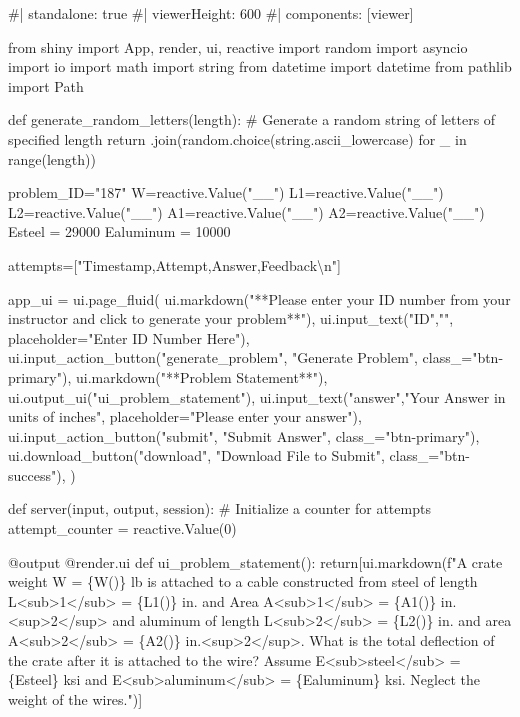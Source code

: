 \documentclass[
  letterpaper,
  DIV=11,
  numbers=noendperiod]{scrreprt}
\newenvironment{Shaded}{\begin{snugshade}}{\end{snugshade}}
\newcommand{\NormalTok}[1]{\textcolor[rgb]{0.00,0.23,0.31}{#1}}
\begin{document}
\begin{Shaded}
\begin{Highlighting}[]
\NormalTok{\#| standalone: true}
\NormalTok{\#| viewerHeight: 600}
\NormalTok{\#| components: [viewer]}

\NormalTok{from shiny import App, render, ui, reactive}
\NormalTok{import random}
\NormalTok{import asyncio}
\NormalTok{import io}
\NormalTok{import math}
\NormalTok{import string}
\NormalTok{from datetime import datetime}
\NormalTok{from pathlib import Path}

\NormalTok{def generate\_random\_letters(length):}
\NormalTok{    \# Generate a random string of letters of specified length}
\NormalTok{    return \textquotesingle{}\textquotesingle{}.join(random.choice(string.ascii\_lowercase) for \_ in range(length)) }

\NormalTok{problem\_ID="187"}
\NormalTok{W=reactive.Value("\_\_")}
\NormalTok{L1=reactive.Value("\_\_")}
\NormalTok{L2=reactive.Value("\_\_")}
\NormalTok{A1=reactive.Value("\_\_")}
\NormalTok{A2=reactive.Value("\_\_")}
\NormalTok{Esteel = 29000}
\NormalTok{Ealuminum = 10000}


\NormalTok{attempts=["Timestamp,Attempt,Answer,Feedback\textbackslash{}n"]}

\NormalTok{app\_ui = ui.page\_fluid(}
\NormalTok{    ui.markdown("**Please enter your ID number from your instructor and click to generate your problem**"),}
\NormalTok{    ui.input\_text("ID","", placeholder="Enter ID Number Here"),}
\NormalTok{    ui.input\_action\_button("generate\_problem", "Generate Problem", class\_="btn{-}primary"),}
\NormalTok{    ui.markdown("**Problem Statement**"),}
\NormalTok{    ui.output\_ui("ui\_problem\_statement"),}
\NormalTok{    ui.input\_text("answer","Your Answer in units of inches", placeholder="Please enter your answer"),}
\NormalTok{    ui.input\_action\_button("submit", "Submit Answer", class\_="btn{-}primary"),}
\NormalTok{    ui.download\_button("download", "Download File to Submit", class\_="btn{-}success"),}
\NormalTok{)}


\NormalTok{def server(input, output, session):}
\NormalTok{    \# Initialize a counter for attempts}
\NormalTok{    attempt\_counter = reactive.Value(0)}

\NormalTok{    @output}
\NormalTok{    @render.ui}
\NormalTok{    def ui\_problem\_statement():}
\NormalTok{        return[ui.markdown(f"A crate weight W = \{W()\} lb is attached to a cable constructed from steel of length L\textless{}sub\textgreater{}1\textless{}/sub\textgreater{} = \{L1()\} in. and Area A\textless{}sub\textgreater{}1\textless{}/sub\textgreater{} = \{A1()\} in.\textless{}sup\textgreater{}2\textless{}/sup\textgreater{} and aluminum of length L\textless{}sub\textgreater{}2\textless{}/sub\textgreater{} = \{L2()\} in. and area A\textless{}sub\textgreater{}2\textless{}/sub\textgreater{} = \{A2()\} in.\textless{}sup\textgreater{}2\textless{}/sup\textgreater{}. What is the total deflection of the crate after it is attached to the wire? Assume E\textless{}sub\textgreater{}steel\textless{}/sub\textgreater{} = \{Esteel\} ksi and E\textless{}sub\textgreater{}aluminum\textless{}/sub\textgreater{} = \{Ealuminum\} ksi. Neglect the weight of the wires.")]}
    

\end{Highlighting}
\end{Shaded}
\end{document}
